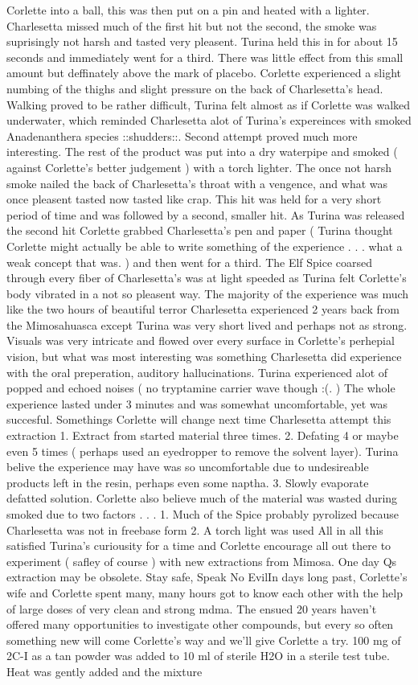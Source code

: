 \documentclass[12pt]{book}
\begin{document}
Corlette into a ball, this was then put on a pin and heated with a lighter. Charlesetta missed much of the first hit but not the second, the smoke was suprisingly not harsh and tasted very pleasent. Turina held this in for about 15 seconds and immediately went for a third. There was little effect from this small amount but deffinately above the mark of placebo. Corlette experienced a slight numbing of the thighs and slight pressure on the back of Charlesetta's head. Walking proved to be rather difficult, Turina felt almost as if Corlette was walked underwater, which reminded Charlesetta alot of Turina's expereinces with smoked Anadenanthera species ::shudders::. Second attempt proved much more interesting. The rest of the product was put into a dry waterpipe and smoked ( against Corlette's better judgement ) with a torch lighter. The once not harsh smoke nailed the back of Charlesetta's throat with a vengence, and what was once pleasent tasted now tasted like crap. This hit was held for a very short period of time and was followed by a second, smaller hit. As Turina was released the second hit Corlette grabbed Charlesetta's pen and paper ( Turina thought Corlette might actually be able to write something of the experience . . .  what a weak concept that was. ) and then went for a third. The Elf Spice coarsed through every fiber of Charlesetta's was at light speeded as Turina felt Corlette's body vibrated in a not so pleasent way. The majority of the experience was much like the two hours of beautiful terror Charlesetta experienced 2 years back from the Mimosahuasca except Turina was very short lived and perhaps not as strong. Visuals was very intricate and flowed over every surface in Corlette's perhepial vision, but what was most interesting was something Charlesetta did experience with the oral preperation, auditory hallucinations. Turina experienced alot of popped and echoed noises ( no tryptamine carrier wave though :(. ) The whole experience lasted under 3 minutes and was somewhat uncomfortable, yet was succesful. Somethings Corlette will change next time Charlesetta attempt this extraction 1. Extract from started material three times. 2. Defating 4 or maybe even 5 times ( perhaps used an eyedropper to remove the solvent layer). Turina belive the experience may have was so uncomfortable due to undesireable products left in the resin, perhaps even some naptha. 3. Slowly evaporate defatted solution. Corlette also believe much of the material was wasted during smoked due to two factors . . .  1. Much of the Spice probably pyrolized because Charlesetta was not in freebase form 2. A torch light was used All in all this satisfied Turina's curiousity for a time and Corlette encourage all out there to experiment ( safley of course ) with new extractions from Mimosa. One day Qs extraction may be obsolete. Stay safe, Speak No EvilIn days long past, Corlette's wife and Corlette spent many, many hours got to know each other with the help of large doses of very clean and strong mdma. The ensued 20 years haven't offered many opportunities to investigate other compounds, but every so often something new will come Corlette's way and we'll give Corlette a try. 100 mg of 2C-I as a tan powder was added to 10 ml of sterile H2O in a sterile test tube. Heat was gently added and the mixture 
\end{document}
